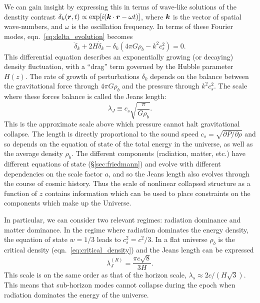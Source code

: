 We can gain insight by expressing this in terms of
wave-like solutions of the denstity contrast
$\delta_k(\boldsymbol{r}, t) \propto \exp[i(\boldsymbol{k}\cdot\boldsymbol{r} - \omega t)]$,
where $\boldsymbol{k}$ is the vector of spatial wave-numbers, and $\omega$
is the oscillation frequency.  In terms of these Fourier modes,
eqn.~\ref{eq:delta_evolution} becomes
\begin{equation}
  \label{eq:delta_evolution_k}
  \ddot{\delta}_k + 2 H \dot{\delta}_k - \delta_k(4\pi G\rho_b - k^2c_s^2) = 0.
\end{equation}
This differential equation describes an exponentially growing (or decaying)
density fluctuation, with a ``drag'' term governed by the Hubble parameter
$H(z)$.  The rate of growth of perturbations $\delta_k$ depends
on the balance between the gravitational force through $4\pi G\rho_b$ and the
pressure through $k^2c_s^2$.  The scale where these forces balance
is called the Jeans length:
\begin{equation}
  \label{eq:jeans_length}
  \lambda_J \equiv c_s \sqrt{\frac{\pi}{G\rho_b}}.
\end{equation}
This is the approximate scale above which pressure cannot halt gravitational
collapse.  The length is directly proportional to the sound speed
$c_s = \sqrt{\partial P/\partial \rho}$ and so depends on the equation of
state of the total energy in the universe,
as well as the average density $\rho_b$.
The different components (radiation, matter, etc.) have different
equations of state (\S\ref{sec:friedmann}) and evolve
with different dependencies on the scale factor
$a$, and so the Jeans length also evolves through the course of cosmic
history.  Thus the scale of nonlinear
collapsed structure as a function of $z$ contains information which can
be used to place constraints on the components which make up the Universe.

In particular, we can consider two relevant regimes: radiation dominance
and matter dominance.  In the regime where radiation dominates the energy
density, the equation of state $w=1/3$ leads to $c_s^2 = c^2/3$.  In a flat
universe $\rho_b$ is the critical density (eqn.~\ref{eq:critical_density})
and the Jeans length can be expressed
\begin{equation}
  \label{eq:jeans_radiation}
  \lambda_J^{(R)} = \frac{\pi c \sqrt{8}}{3 H}.
\end{equation}
This scale is on the same order as that of the horizon scale,
$\lambda_s \approx 2c / (H\sqrt{3})$.  This means that sub-horizon modes
cannot collapse during the epoch when radiation dominates the energy
of the universe.

